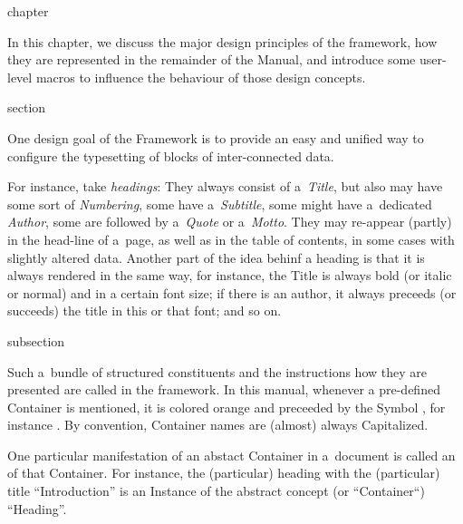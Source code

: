 \begin{Heading}{chapter}
\end{Heading}

In this chapter, we discuss the major design principles of the
{\CoCoTeX} framework, how they are represented in the remainder of the
Manual, and introduce some user-level macros to influence the
behaviour of those design concepts.


\begin{Heading}{section}
\end{Heading}

One design goal of the {\CoCoTeX} Framework is to provide an easy and
unified way to configure the typesetting of blocks of inter-connected
data.

For instance, take \textit{headings}: They always consist of
a~\textit{Title}, but also may have some sort of \textit{Numbering},
some have a~\textit{Subtitle}, some might have a~dedicated
\textit{Author}, some are followed by a~\textit{Quote} or
a~\textit{Motto}. They may re-appear (partly) in the head-line of
a~page, as well as in the table of contents, in some cases with
slightly altered data. Another part of the idea behinf a heading is
that it is always rendered in the same way, for instance, the Title is
always bold (or italic or normal) and in a certain font size; if there
is an author, it always preceeds (or succeeds) the title in this or
that font; and so on.


\begin{Heading}{subsection}
\end{Heading}

Such a~bundle of structured constituents and the instructions how they
are presented are called  in the
{\CoCoTeX} framework. In this manual, whenever a pre-defined Container
is mentioned, it is colored orange and preceeded by the Symbol
{\ContainerSymbol}, for instance . By
convention, Container names are (almost) always Capitalized.

One particular manifestation of an abstact Container in a~document is
called an  of that Container. For instance, the
(particular) heading with the (particular) title “Introduction” is an
Instance of the abstract concept (or “Container“) “Heading”.

